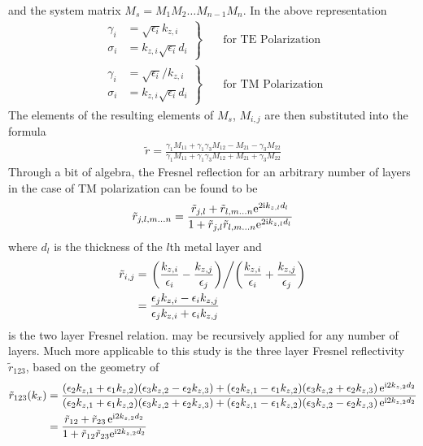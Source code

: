 and the system matrix $M_s = M_1 M_2 \ldots M_{n-1} M_n$.  In the above
representation
\begin{align}
\left.\begin{aligned}
\gamma_i &= \sqrt{\epsilon_i} k_{z,i}\\
\sigma_i &= k_{z,i} \sqrt{\epsilon_i} d_i
\end{aligned}
\right\}& \quad \text{for TE Polarization}\\
\left.\begin{aligned}
\gamma_i &= \sqrt{\epsilon_i}/k_{z,i}\\
\sigma_i &= k_{z,i} \sqrt{\epsilon_i} d_i
\end{aligned}
\right\}& \quad \text{for TM Polarization}
\end{align}
The elements of the resulting elements of $M_s$, $M_{i,j}$ are then
substituted into the formula
\begin{align}
\tilde{r}=
\frac{\gamma_1 M_{11}+\gamma_1 \gamma_3 M_{12} - M_{21} - \gamma_3 M_{22}}
{\gamma_1 M_{11}+\gamma_1 \gamma_3 M_{12} + M_{21} + \gamma_3 M_{22}}
\end{align}
Through a bit of algebra, the Fresnel reflection for an arbitrary number of
layers in the case of TM polarization can be found to be
\begin{align}
\tilde{r}_{j,l,m \ldots n} = 
\frac{\tilde{r}_{j,l} + \tilde{r}_{l,m \ldots n} {\mathrm{e}}^{2 {\mathrm{i}} k_{z,l} d_l}}
{1+\tilde{r}_{j,l} \tilde{r}_{l,m \ldots n} {\mathrm{e}}^{2 {\mathrm{i}} k_{z,l} d_l}}
\label{eqn:bertnlayer}
\end{align}
where $d_l$ is the thickness of the $l$th metal layer and 
\begin{align}
\tilde{r}_{i,j}&=
\left.\left(\frac{k_{z,i}}{\epsilon_i}-\frac{k_{z,j}}{\epsilon_j}\right)
\middle/
\left(\frac{k_{z,i}}{\epsilon_i}+\frac{k_{z,j}}{\epsilon_j}\right)\right.\\
&=\frac{\epsilon_j k_{z,i}-\epsilon_i k_{z,j}}
{\epsilon_j k_{z,i}+\epsilon_i k_{z,j}}
\end{align}
is the two layer Fresnel relation.   may be
recursively applied for any number of layers.  Much more applicable to this
study is the three layer Fresnel reflectivity $\tilde{r}_{123}$, based on
the geometry of 
\begin{align}
\tilde{r}_{123}(k_x) &=
\frac{
  (\epsilon_2 k_{z,1}+\epsilon_1 k_{z,2})(\epsilon_3 k_{z,2}-\epsilon_2 k_{z,3})
+ (\epsilon_2 k_{z,1}-\epsilon_1 k_{z,2})(\epsilon_3 k_{z,2}+\epsilon_2 k_{z,3})\,
{\mathrm{e}}^{{\mathrm{i}} 2 k_{z,2} d_2}
}
{
  (\epsilon_2 k_{z,1}+\epsilon_1 k_{z,2})(\epsilon_3 k_{z,2}+\epsilon_2 k_{z,3})
+ (\epsilon_2 k_{z,1}-\epsilon_1 k_{z,2})(\epsilon_3 k_{z,2}-\epsilon_2 k_{z,3})\,
{\mathrm{e}}^{{\mathrm{i}} 2 k_{z,2} d_2}
}\\
&=
\frac{\tilde{r}_{12}+\tilde{r}_{23}\, {\mathrm{e}}^{{\mathrm{i}} 2 k_{z,2} d_2}} {1+\tilde{r}_{12} \tilde{r}_{23} {\mathrm{e}}^{{\mathrm{i}} 2 k_{z,2} d_2}}
\label{eqn:fresnel123}
\end{align}
